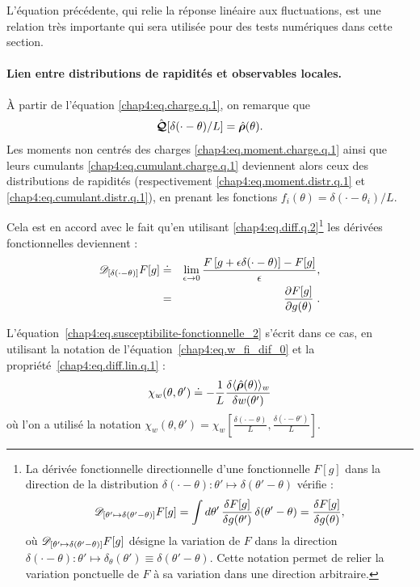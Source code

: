 \medskip

L'équation précédente, qui relie la réponse linéaire aux fluctuations, est une relation très importante qui sera utilisée pour des tests numériques dans cette section.

\paragraph{Lien entre distributions de rapidités et observables locales.}

À partir de l’équation \eqref{chap4:eq.charge.q.1}, on remarque que
\begin{eqnarray}
	\hat{\bm{\mathcal{Q}}}[\delta(\cdot - \theta)/L] = \hat{\bm{\rho}}(\theta).
\end{eqnarray}
Les moments non centrés des charges \eqref{chap4:eq.moment.charge.q.1} ainsi que leurs cumulants \eqref{chap4:eq.cumulant.charge.q.1} deviennent alors ceux des distributions de rapidités (respectivement \eqref{chap4:eq.moment.distr.q.1} et \eqref{chap4:eq.cumulant.distr.q.1}), en prenant les fonctions $f_i(\theta) = \delta(\cdot - \theta_i)/L$.

\smallskip

Cela est en accord avec le fait qu'en utilisant \eqref{chap4:eq.diff.q.2}\footnote{La dérivée fonctionnelle directionnelle d'une fonctionnelle $F[g]$ dans la direction de la distribution $\delta(\cdot - \theta) \colon \theta' \mapsto \delta(\theta' - \theta)$ vérifie :
\[
\mathscr{D}_{[\theta' \mapsto \delta(\theta' - \theta)]} F[g] 
= \int d\theta' \, \frac{\delta F[g]}{\delta g(\theta')} \, \delta(\theta' - \theta) 
= \frac{\delta F[g]}{\delta g(\theta)},
\]
où $\mathscr{D}_{[\theta' \mapsto \delta(\theta' - \theta)]} F[g] $ désigne la variation de $F$ dans la direction $\delta(\cdot - \theta) \colon \theta' \mapsto \delta_\theta(\theta') \equiv \delta(\theta'-\theta)$. Cette notation permet de relier la variation ponctuelle de $F$ à sa variation dans une direction arbitraire.
} les dérivées fonctionnelles deviennent :
\begin{eqnarray}\label{chap4:eq.w_fi_dif_0}
	\mathscr{D}_{[\delta(\cdot - \theta)]} F[g] &\doteq& \lim_{\epsilon \to 0} \frac{F\left[g + \epsilon \delta(\cdot - \theta)\right] - F[g]}{\epsilon}, \\
	& = & \left. \frac{\partial F[g]}{\partial g(\theta)} \right. .
\end{eqnarray}



L’équation~\eqref{chap4:eq.susceptibilite-fonctionnelle_2} s’écrit dans ce cas, en utilisant la notation de l’équation~\eqref{chap4:eq.w_fi_dif_0} et la propriété~\eqref{chap4:eq.diff.lin.q.1} :
\begin{equation}\label{chap4:eq.susceptibilite-fonctionnelle_3}
	\chi_w(\theta, \theta') \doteq -\frac{1}{L} \frac{\delta \langle \hat{\bm{\rho}}(\theta) \rangle_w}{\delta w(\theta')}
\end{equation}
où l’on a utilisé la notation $\chi_w(\theta, \theta') = \chi_w\left[\frac{\delta(\cdot - \theta)}{L}, \frac{\delta(\cdot - \theta')}{L} \right]$.

